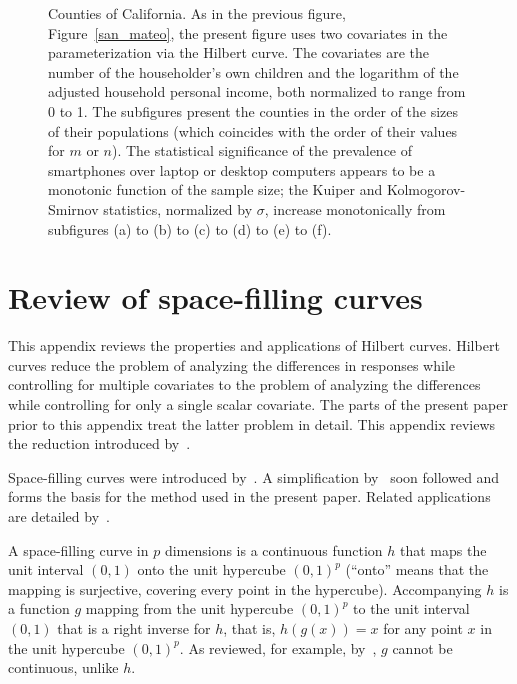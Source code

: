 \documentclass[]{fairmeta}
\begin{document}
\begin{figure}
\begin{centering}
\end{centering}

\vspace{.5\vertsep}

\caption{Counties of California.
         As in the previous figure, Figure~\ref{san_mateo},
         the present figure uses two covariates in the parameterization
         via the Hilbert curve. The covariates are the number
         of the householder's own children and the logarithm
         of the adjusted household personal income, both normalized
         to range from 0 to 1.
         The subfigures present the counties in the order of the sizes
         of their populations (which coincides with the order of their values
         for $m$ or $n$).
         The statistical significance of the prevalence of smartphones
         over laptop or desktop computers appears to be a monotonic function
         of the sample size; the Kuiper and Kolmogorov-Smirnov statistics,
         normalized by $\sigma$, increase monotonically from subfigures
         (a) to (b) to (c) to (d) to (e) to (f).
}
\label{counties}
\end{figure}



\clearpage



\appendix
\section{Review of space-filling curves}
\label{multidim}

This appendix reviews the properties and applications of Hilbert curves.
Hilbert curves reduce the problem of analyzing the differences in responses
while controlling for multiple covariates to the problem of analyzing
the differences while controlling for only a single scalar covariate.
The parts of the present paper prior to this appendix treat the latter problem
in detail.
This appendix reviews the reduction introduced by~\cite{tygert_multidim}.

Space-filling curves were introduced by~\cite{peano}.
A simplification by~\cite{hilbert} soon followed
and forms the basis for the method used in the present paper.
Related applications are detailed by~\cite{moon-jagadish-faloutsos-saltz}.

A space-filling curve in $p$ dimensions is a continuous function $h$
that maps the unit interval $(0, 1)$ onto the unit hypercube $(0, 1)^p$
(``onto'' means that the mapping is surjective, covering every point
in the hypercube).
Accompanying $h$ is a function $g$ mapping from the unit hypercube $(0, 1)^p$
to the unit interval $(0, 1)$ that is a right inverse for $h$, that is,
$h(g(x)) = x$ for any point $x$ in the unit hypercube $(0, 1)^p$.
As reviewed, for example, by~\cite{tygert_multidim},
$g$ cannot be continuous, unlike $h$.
\end{document}
